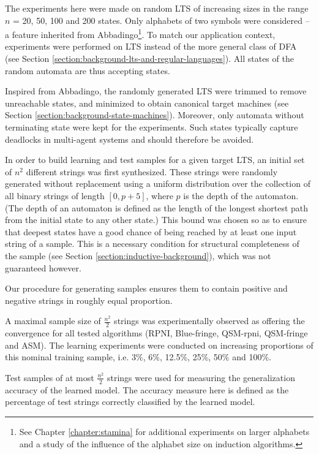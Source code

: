 The experiments here were made on random LTS of increasing sizes in the range $n$ = 20, 50, 100 and 200 states. Only alphabets of two symbols were considered -- a feature inherited from Abbadingo\footnote{See Chapter \ref{chapter:stamina} for additional experiments on larger alphabets and a study of the influence of the alphabet size on induction algorithms.}. To match our application context, experiments were performed on LTS instead of the more general class of DFA (see Section \ref{section:background-lts-and-regular-languages}). All states of the random automata are thus accepting states.

Inspired from Abbadingo, the randomly generated LTS were trimmed to remove unreachable states, and minimized to obtain canonical target machines (see Section \ref{section:background-state-machines}). Moreover, only automata without terminating state were kept for the experiments. Such states typically capture deadlocks in multi-agent systems and should therefore be avoided.

In order to build learning and test samples for a given target LTS, an initial set of $n^2$ different strings was first synthesized. These strings were randomly generated without replacement using a uniform distribution over the collection of all binary strings of length $[0, p+5]$, where $p$ is the depth of the automaton. (The depth of an automaton is defined as the length of the longest shortest path from the initial state to any other state.) This bound was chosen so as to ensure that deepest states have a good chance of being reached by at least one input string of a sample. This is a necessary condition for structural completeness of the sample (see Section \ref{section:inductive-background}), which was not guaranteed however.

Our procedure for generating samples ensures them to contain positive and negative strings in roughly equal proportion.
 
A maximal sample size of $\frac{n^2}{2}$ strings was experimentally observed as offering the convergence for all tested algorithms (RPNI, Blue-fringe, QSM-rpni, QSM-fringe and ASM). The learning experiments were conducted on increasing proportions of this nominal training sample, i.e. 3\%, 6\%, 12.5\%, 25\%, 50\% and 100\%.

Test samples of at most $\frac{n^2}{2}$ strings were used for measuring the generalization accuracy of the learned model. The accuracy measure here is defined as the percentage of test strings correctly classified by the learned model.

